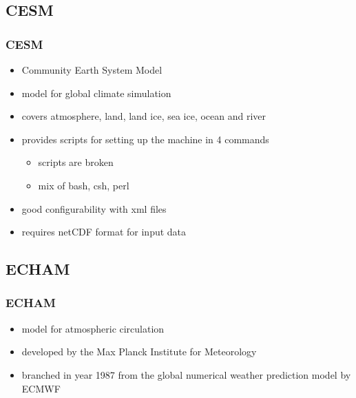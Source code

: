 \documentclass[compress]{beamer}
\begin{document}
\subsection{CESM}
\begin{frame}
    \frametitle{CESM}
    	\begin{itemize}
    	    \item Community Earth System Model
			\item model for global climate simulation
			\item covers atmosphere, land, land ice, sea ice, ocean and river
			\item provides scripts for setting up the machine in 4 commands
	    	\begin{itemize}
		    	\item scripts are broken
		    	\item mix of bash, csh, perl
		    \end{itemize}
		    \item good configurability with xml files
		    \item requires netCDF format for input data \cite{CESMDocs}
		\end{itemize}
\end{frame}

\subsection{ECHAM}
\begin{frame}
	\frametitle{ECHAM}
	\begin{itemize}
		\item model for atmospheric circulation
		\item developed by the Max Planck Institute for Meteorology
		\item branched in year 1987 from the global numerical weather prediction model by ECMWF
	\end{itemize}
\end{frame}
\end{document}
